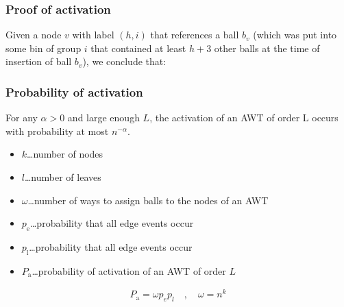\documentclass[serif,professionalfonts]{beamer}
\begin{document}
\begin{frame}
\frametitle{Proof of activation}
Given a node $v$ with label $(h,i)$ that references a ball $b_v$ (which was put into some bin of group $i$ that contained at least $h+3$ other balls at the time of insertion of ball $b_v$), \alert{we conclude} that:
\begin{enumerate}
\end{enumerate}

\end{frame}


\begin{frame}
\frametitle{Probability of activation}
\begin{lemma}
For any $\alpha > 0$ and large enough $L$, the activation of an AWT of order L occurs with probability at most $n^{-\alpha}$.
\end{lemma}
\medskip
\begin{itemize}
\item $k$\dots number of nodes
\item $l$\dots number of leaves
\item $\omega$\dots number of ways to assign balls to the nodes of an AWT
\item $p_\mathrm{e}$\dots probability that all edge events occur
\item $p_\mathrm{l}$\dots probability that all edge events occur
\item $P_\mathrm{a}$\dots probability of activation of an AWT of order $L$
\end{itemize}

\begin{align*}
P_\mathrm{a} = \omega p_e p_l \quad , \quad \omega = n^k 
\end{align*}
\end{frame}
\end{document}
